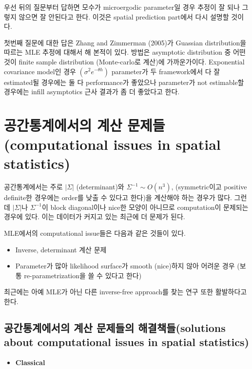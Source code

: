 \documentclass[b5paper,]{scrbook}
\providecommand{\tightlist}{%
  \setlength{\itemsep}{0pt}\setlength{\parskip}{0pt}}
\theoremstyle{plain}
\theoremstyle{definition}
\numberwithin{equation}{section}
\begin{document}
우선 뒤의 질문부터 답하면 모수가 microergodic parameter일 경우 추정이 잘 되나 그렇지 않으면 잘 안된다고 한다. 이것은 spatial prediction part에서 다시 설명할 것이다.

첫번째 질문에 대한 답은 Zhang and Zimmerman (2005)가 Guassian distribution을 따르는 MLE 추정에 대해서 해 본적이 있다. 방법은 asymptotic distribution 중 어떤 것이 finite sample distribution (Monte-carlo로 계산)에 가까운가이다. Exponential covariance model인 경우 \((\sigma^{2}e^{-\theta h})\) parameter가 두 framework에서 다 잘 estimated될 경우에는 둘 다 performance가 좋았으나 parameter가 not estimable할 경우에는 infill asymptotics 근사 결과가 좀 더 좋았다고 한다.

\hypertarget{--computational-issues-in-spatial-statistics}{%
\section{공간통계에서의 계산 문제들(computational issues in spatial statistics)}\label{--computational-issues-in-spatial-statistics}}

공간통계에서는 주로 \(|\Sigma|\) (determinant)와 \(\Sigma^{-1} \sim O(n^{3})\), (symmetric이고 positive definite한 경우에는 order를 낮출 수 있다고 한다)을 계산해야 하는 경우가 많다. 그런데 \(|\Sigma|\)나 \(\Sigma^{-1}\)이 block diagonal이나 nice한 모양이 아니므로 computation이 문제되는 경우에 있다. 이는 데이터가 커지고 있는 최근에 더 문제가 된다.

MLE에서의 computational issue들은 다음과 같은 것들이 있다.

\begin{itemize}
\item
  Inverse, determinant 계산 문제
\item
  Parameter가 많아 likelihood surface가 smooth (nice)하지 않아 어려운 경우 (보통 re-parametrization을 쓸 수 있다고 한다)
\end{itemize}

최근에는 아예 MLE가 아닌 다른 inverse-free approach를 찾는 연구 또한 활발하다고 한다.

\hypertarget{---solutions-about-computational-issues-in-spatial-statistics}{%
\subsection{공간통계에서의 계산 문제들의 해결책들(solutions about computational issues in spatial statistics)}\label{---solutions-about-computational-issues-in-spatial-statistics}}

\begin{itemize}
\tightlist
\item
  \textbf{Classical}
\end{itemize}
\end{document}
